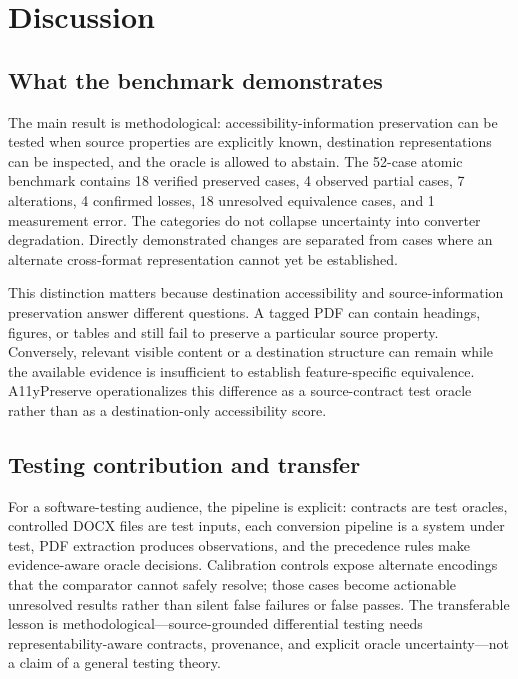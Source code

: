\section{Discussion}
\label{sec:discussion}

\subsection{What the benchmark demonstrates}

The main result is methodological: accessibility-information preservation can be tested when source properties are explicitly known, destination representations can be inspected, and the oracle is allowed to abstain. The 52-case atomic benchmark contains 18 verified preserved cases, 4 observed partial cases, 7 alterations, 4 confirmed losses, 18 unresolved equivalence cases, and 1 measurement error. The categories do not collapse uncertainty into converter degradation. Directly demonstrated changes are separated from cases where an alternate cross-format representation cannot yet be established.

This distinction matters because destination accessibility and source-information preservation answer different questions. A tagged PDF can contain headings, figures, or tables and still fail to preserve a particular source property. Conversely, relevant visible content or a destination structure can remain while the available evidence is insufficient to establish feature-specific equivalence. A11yPreserve operationalizes this difference as a source-contract test oracle rather than as a destination-only accessibility score.

\subsection{Testing contribution and transfer}

For a software-testing audience, the pipeline is explicit: contracts are test oracles, controlled DOCX files are test inputs, each conversion pipeline is a system under test, PDF extraction produces observations, and the precedence rules make evidence-aware oracle decisions. Calibration controls expose alternate encodings that the comparator cannot safely resolve; those cases become actionable unresolved results rather than silent false failures or false passes. The transferable lesson is methodological—source-grounded differential testing needs representability-aware contracts, provenance, and explicit oracle uncertainty—not a claim of a general testing theory.

